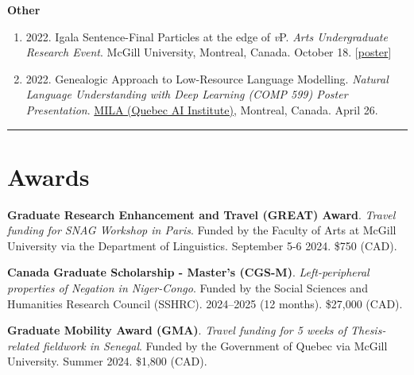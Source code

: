 \documentclass[margin,line]{resume}
\begin{document}
\begin{resume}
\begin{comment}
		\item[] {2022. \href{https://mcling.blogs.mcgill.ca/2022/03/27/mull-lab-03-30-brandon-chaperon/}{Igala's Dual Negation}. \href{https://mull-lab.org/}{MULL Lab} meeting. McGill University. March 30.}
	\end{enumerate}
\end{comment}

	\textbf{Other}
	\begin{enumerate}[-, leftmargin=1em, topsep=2pt]
		\item[] {2022. Igala Sentence-Final Particles at the edge of \textit{v}P. {\it Arts Undergraduate Research Event}. McGill University, Montreal, Canada. October 18. [\href{https://www.mcgill.ca/arts-internships/files/arts-internships/brandon_chaperon.pdf}{poster}]}

		\item[] {2022. Genealogic Approach to Low-Resource Language Modelling. {\it Natural Language Understanding with Deep Learning (COMP 599) Poster Presentation}. \href{https://mila.quebec/en/}{MILA (Quebec AI Institute)}, Montreal, Canada. April 26.}

	\end{enumerate}


	\vspace{-0.9em}\rule{\textwidth}{0.4pt}


		\vspace{-0.5em}

		\section{\mysidestyle Awards}

	
		{\textbf{Graduate Research Enhancement and Travel (GREAT) Award}. \textit{Travel funding for SNAG Workshop in Paris}. Funded by the Faculty of Arts at McGill University via the Department of Linguistics. September 5-6 2024. \$750 (CAD).}
	
		{\textbf{Canada Graduate Scholarship - Master's (CGS-M)}. \textit{Left-peripheral properties of Negation in Niger-Congo}. Funded by the Social Sciences and Humanities Research Council (SSHRC). 2024--2025 (12 months). \$27,000 (CAD).}
		
		{\textbf{Graduate Mobility Award (GMA)}. \textit{Travel funding for 5 weeks of Thesis-related fieldwork in Senegal}. Funded by the Government of Quebec via McGill University. %
		Summer 2024. \$1,800 (CAD).}	
		

\end{resume}
\end{document}
